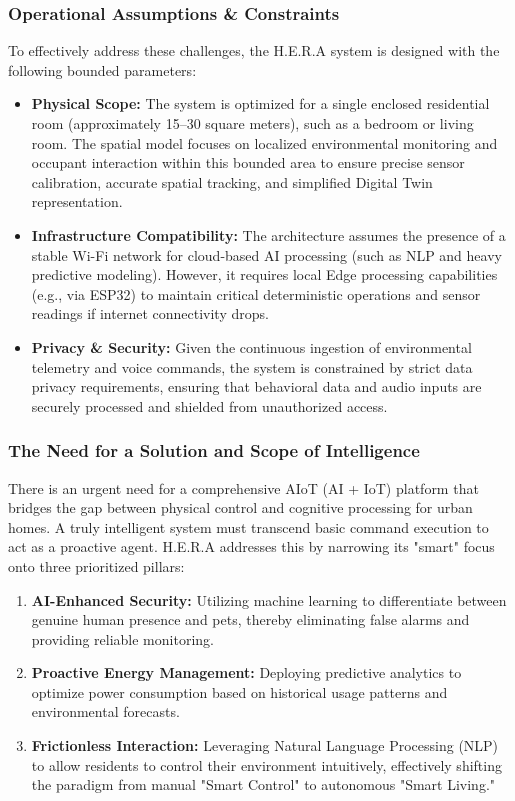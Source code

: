 \subsubsection*{Operational Assumptions \& Constraints}
To effectively address these challenges, the H.E.R.A system is designed with the following bounded parameters:

\begin{itemize}
    \item \textbf{Physical Scope:} The system is optimized for a single enclosed residential room (approximately 15--30 square meters), such as a bedroom or living room. The spatial model focuses on localized environmental monitoring and occupant interaction within this bounded area to ensure precise sensor calibration, accurate spatial tracking, and simplified Digital Twin representation.
    \item \textbf{Infrastructure Compatibility:} The architecture assumes the presence of a stable Wi-Fi network for cloud-based AI processing (such as NLP and heavy predictive modeling). However, it requires local Edge processing capabilities (e.g., via ESP32) to maintain critical deterministic operations and sensor readings if internet connectivity drops.
    \item \textbf{Privacy \& Security:} Given the continuous ingestion of environmental telemetry and voice commands, the system is constrained by strict data privacy requirements, ensuring that behavioral data and audio inputs are securely processed and shielded from unauthorized access.
\end{itemize}

\subsubsection*{The Need for a Solution and Scope of Intelligence}
There is an urgent need for a comprehensive AIoT (AI + IoT) platform that bridges the gap between physical control and cognitive processing for urban homes. A truly intelligent system must transcend basic command execution to act as a proactive agent. H.E.R.A addresses this by narrowing its "smart" focus onto three prioritized pillars:

\begin{enumerate}
    \item \textbf{AI-Enhanced Security:} Utilizing machine learning to differentiate between genuine human presence and pets, thereby eliminating false alarms and providing reliable monitoring.
    \item \textbf{Proactive Energy Management:} Deploying predictive analytics to optimize power consumption based on historical usage patterns and environmental forecasts.
    \item \textbf{Frictionless Interaction:} Leveraging Natural Language Processing (NLP) to allow residents to control their environment intuitively, effectively shifting the paradigm from manual "Smart Control" to autonomous "Smart Living."
\end{enumerate}

